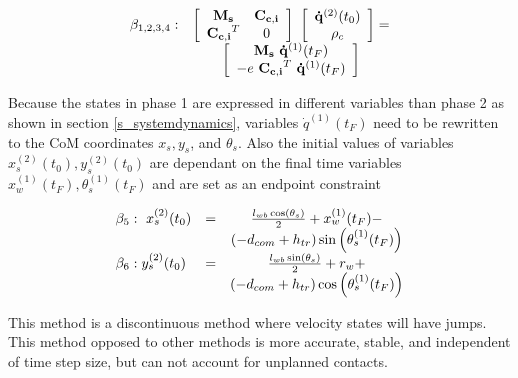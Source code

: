 \documentclass[default,iicol]{sn-jnl}
\begin{document}
\begin{equation}
\begin{array}{l c}
    \beta_{1,2,3,4}: & \left[\begin{array}{cc}
        \mathbf{M_s} & \mathbf{C_{c,i}} \\
        \mathbf{C_{c,i}}^T & 0
    \end{array} \right]\
    \left[\begin{array}{c}
       \mathbf{\dot q}^{(2)}(t_0)  \\
        \rho_c 
    \end{array}\right] =
     \\ &  
     \left[\begin{array}{c}
         \mathbf{M_s}\ \mathbf{\dot q}^{(1)}(t_F)   \\
         -e\ \mathbf{C_{c,i}}^T\ \mathbf{\dot q}^{(1)}(t_F)
    \end{array}\right]
    \end{array}
\end{equation}

Because the states in phase 1 are expressed in different variables than phase 2 as shown in section \ref{s_systemdynamics}, variables $\dot q^{(1)}(t_F)$ need to be rewritten to the CoM coordinates $x_s,y_s$, and $\theta_s$. Also the initial values of variables $x_s^{(2)}(t_0), y_s^{(2)}(t_0)$ are dependant on the final time variables $x_w^{(1)}(t_F), \theta_s^{(1)}(t_F)$ and are set as an endpoint constraint

\begin{equation}
\begin{array}{l c c}
\beta_5: \ x_s^{(2)}(t_0) & = & \frac{l_{w b} \cos \left(\theta_s\right)}{2}+x_w^{(1)}(t_F)- \\ 
& & \left(-d_{c o m}+h_{t r}\right) \sin \left(\theta_s^{(1)}(t_F)\right) \\

\beta_6: y_s^{(2)}(t_0) & = & \frac{l_{w b} \sin \left(\theta_s\right)}{2}+r_w+ \\ 
& & \left(-d_{c o m}+h_{t r}\right) \cos \left(\theta_s^{(1)}(t_F)\right)
\end{array}
\end{equation}

This method is a discontinuous method where velocity states will have jumps. This method opposed to other methods is more accurate, stable, and independent of time step size, but can not account for unplanned contacts\cite{ackermann_optimality_2010}. 
\end{document}
